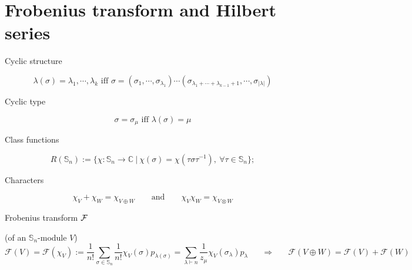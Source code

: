 \documentclass[12pt]{amsart}
\begin{document}
\section{Frobenius transform and Hilbert series}
\vspace{-10pt}
\begin{mdframed}[linecolor=red!20,linewidth=3pt,innertopmargin=8pt]
	\begin{minipage}[t]{14cm}
		\begin{bf}Cyclic structure\end{bf}
		\begin{equation*}\lambda(\sigma)=\lambda_1,\cdots,\lambda_k \text{ iff } \sigma=(\sigma_1,\cdots,\sigma_{\lambda_1})\cdots(\sigma_{\lambda_1+\cdots+\lambda_{k-1}+1},\cdots,\sigma_{|\lambda|})\end{equation*}
	\end{minipage}
	\begin{minipage}[t]{6cm}
		\begin{bf}Cyclic type\end{bf}
		\begin{equation*}\sigma=\sigma_\mu \text{ iff } \lambda(\sigma)=\mu \end{equation*}
	\end{minipage}

	\begin{minipage}[t]{11cm}
		\begin{bf}Class functions\end{bf}
		\begin{equation}R(\mathbb{S}_n):=\{\chi:\mathbb{S}_n\rightarrow \mathbb{C}~ |~ \chi(\sigma)=\chi(\tau\sigma\tau^{-1}),~ \forall \tau \in \mathbb{S}_n\}; 
		\end{equation}
	\end{minipage}
	\begin{minipage}[t]{8cm}
		\begin{bf}Characters\end{bf}
		\begin{equation*}\chi_V+\chi_W=\chi_{V\oplus W}\hspace{20pt}\text{ and }\hspace{20pt}\chi_V\chi_W=\chi_{V\otimes W}			\end{equation*}
	\end{minipage}

	\begin{minipage}[t]{19cm}
		\begin{bf}Frobenius transform $\boldmath{\mathcal{F}}$\end{bf} (of an $\mathbb{S}_n$-module $V$)
		\begin{equation} \mathcal{F}(V)=\mathcal{F}(\chi_V):= \frac{1}{n!}\sum_{\sigma\in\mathbb{S}_n} \frac{1}{n!}\chi_V(\sigma)p_{\lambda(\sigma)}=\sum_{\lambda\vdash n} \frac{1}{z_\mu}\chi_V(\sigma_\lambda)p_\lambda \hspace{20pt}\Rightarrow	\hspace{20pt} \mathcal{F}(V\oplus W)=\mathcal{F}(V)+\mathcal{F}(W)
		\end{equation}
	\end{minipage}
\end{mdframed}
\end{document}
